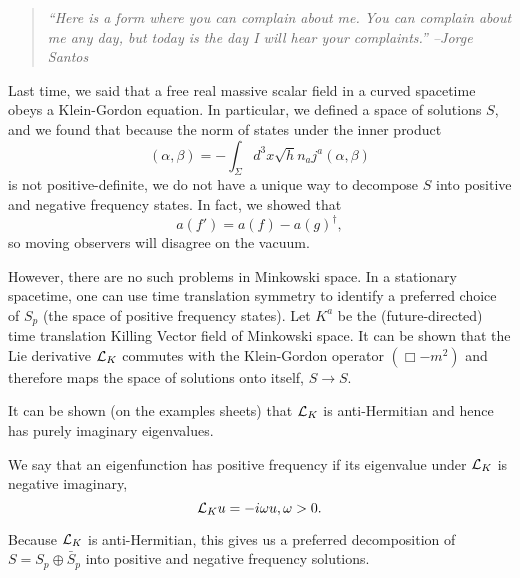 \begin{quote}
    \textit{``Here is a form where you can complain about me. You can complain about me any day, but today is the day I will hear your complaints.'' --Jorge Santos}
\end{quote}

Last time, we said that a free real massive scalar field in a curved spacetime obeys a Klein-Gordon equation. In particular, we defined a space of solutions $S$, and we found that because the norm of states under the inner product
\begin{equation}
    (\alpha,\beta)=-\int_\Sigma d^3x \sqrt{h} n_a j^a(\alpha,\beta)
\end{equation}
is not positive-definite, we do not have a unique way to decompose $S$ into positive and negative frequency states. In fact, we showed that 
\begin{equation}
    a(f')=a(f) -a(g)^\dagger,
\end{equation}
so moving observers will disagree on the vacuum.

However, there are no such problems in Minkowski space. In a stationary spacetime, one can use time translation symmetry to identify a preferred choice of $S_p$ (the space of positive frequency states). Let $K^a$ be the (future-directed) time translation Killing Vector field of Minkowski space. It can be shown that the Lie derivative $\mathcal L_K$ commutes with the Klein-Gordon operator $(\Box -m^2)$ and therefore maps the space of solutions onto itself, $S\to S$.

It can be shown (on the examples sheets) that $\mathcal L_K$ is anti-Hermitian and hence has purely imaginary eigenvalues.
\begin{defn}
    We say that an eigenfunction has positive frequency if its eigenvalue under $\mathcal L_K$ is negative imaginary,
    \begin{equation}
        \mathcal L_K u= -i \omega u, \omega > 0.
    \end{equation}
\end{defn}
Because $\mathcal L_K$ is anti-Hermitian, this gives us a preferred decomposition of $S=S_p \oplus \bar S_p$ into positive and negative frequency solutions.

